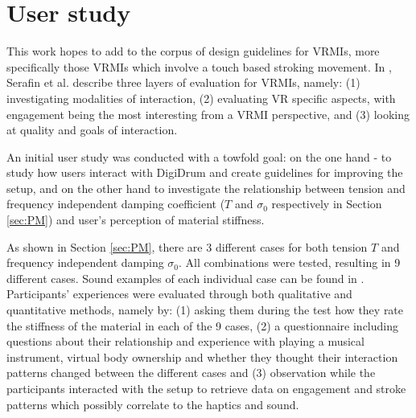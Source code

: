 \documentclass{article}
\begin{document}
\section{User study}\label{sec:exp}

This work hopes to add to the corpus of design guidelines for VRMIs, more specifically those VRMIs which involve a touch based stroking movement. In \cite{Serafin:2016}, Serafin et al. describe three layers of evaluation for VRMIs, namely: (1) investigating modalities of interaction, (2) evaluating VR specific aspects, with engagement being the most interesting from a VRMI perspective, and (3) looking at quality and goals of interaction.

An initial user study was conducted with a towfold goal: on the one hand - to study how users interact with DigiDrum and create guidelines for improving the setup, and on the other hand to investigate the relationship between tension and frequency independent damping coefficient ($T$ and $\sigma_0$ respectively in Section \ref{sec:PM}) and user's perception of material stiffness.

As shown in Section \ref{sec:PM}, there are 3 different cases for both tension $T$ and frequency independent damping $\sigma_0$. All combinations were tested, resulting in 9 different cases. Sound examples of each individual case can be found in \cite{soundfiles}. Participants' experiences were evaluated through both qualitative and quantitative methods, namely by: (1) asking them during the test how they rate the stiffness of the material in each of the 9 cases, (2) a questionnaire including questions about their relationship and experience with playing a musical instrument, virtual body ownership and whether they thought their interaction patterns changed between the different cases and (3) observation while the participants interacted with the setup to retrieve data on engagement and stroke patterns which possibly correlate to the haptics and sound.
\end{document}
